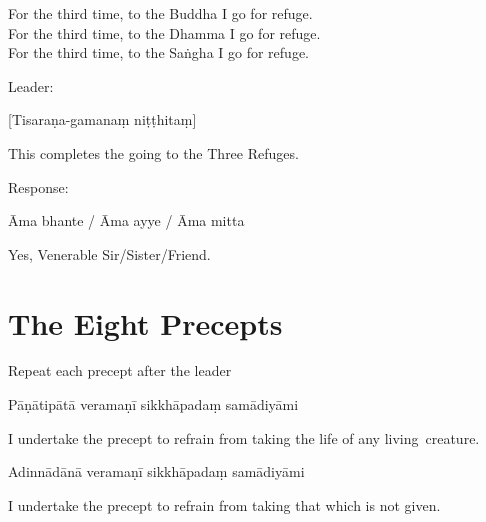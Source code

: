 \begin{english}
  For the third time, to the Buddha I go for refuge.\\
  For the third time, to the Dhamma I go for refuge.\\
  For the third time, to the Saṅgha I go for refuge.
\end{english}

\begin{instruction}
  Leader:
\end{instruction}

[Tisaraṇa-gamanaṃ niṭṭhitaṃ]

\begin{english}
  This completes the going to the Three Refuges.
\end{english}

\begin{instruction}
  Response:
\end{instruction}

Āma bhante / Āma ayye / Āma mitta

\begin{english}
  Yes, Venerable Sir/Sister/Friend.
\end{english}

\chapter{The Eight Precepts}%

\begin{instruction}
  Repeat each precept after the leader
\end{instruction}

\begin{precept}
  \setcounter{enumi}{0}
  \item Pāṇātipātā veramaṇī sikkhāpadaṃ samādiyāmi
\end{precept}

\begin{english}
  I undertake the precept to refrain from taking the life of any living~creature.
\end{english}

\begin{precept}
  \setcounter{enumi}{1}
  \item Adinnādānā veramaṇī sikkhāpadaṃ samādiyāmi
\end{precept}

\begin{english}
  I undertake the precept to refrain from taking that which is not given.
\end{english}

